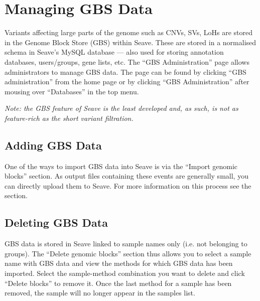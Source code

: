\documentclass[11pt, a4paper]{article}
\begin{document}

\section{Managing GBS Data}

Variants affecting large parts of the genome such as CNVs, SVs, LoHs are stored in the Genome Block Store (GBS) within Seave. These are stored in a normalised schema in Seave's MySQL database --- also used for storing annotation databases, users/groups, gene lists, etc. The ``GBS Administration'' page allows administrators to manage GBS data. The page can be found by clicking ``GBS administration'' from the home page or by clicking ``GBS Administration'' after mousing over ``Databases'' in the top menu.

\textit{Note: the GBS feature of Seave is the least developed and, as such, is not as feature-rich as the short variant filtration.}


\subsection{Adding GBS Data}

One of the ways to import GBS data into Seave is via the ``Import genomic blocks'' section. As output files containing these events are generally small, you can directly upload them to Seave. For more information on this process see the  section.


\subsection{Deleting GBS Data}

GBS data is stored in Seave linked to sample names only (i.e. not belonging to groups). The ``Delete genomic blocks'' section thus allows you to select a sample name with GBS data and view the methods for which GBS data has been imported. Select the sample-method combination you want to delete and click ``Delete blocks'' to remove it. Once the last method for a sample has been removed, the sample will no longer appear in the samples list.
\end{document}
